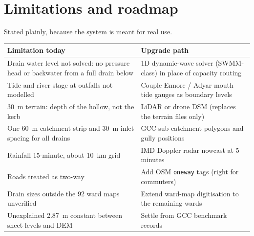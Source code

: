 \documentclass[11pt,a4paper]{article}
\begin{document}
\section{Limitations and roadmap}

Stated plainly, because the system is meant for real use.
\begin{longtable}{@{}p{6.4cm}p{8.0cm}@{}}
\toprule
\textbf{Limitation today} & \textbf{Upgrade path}\\
\midrule\endhead
Drain water level not solved: no pressure head or backwater from a full drain below & 1D dynamic-wave solver (SWMM-class) in place of capacity routing\\
Tide and river stage at outfalls not modelled & Couple Ennore / Adyar mouth tide gauges as boundary levels\\
30~m terrain: depth of the hollow, not the kerb & LiDAR or drone DSM (replaces the terrain files only)\\
One 60~m catchment strip and 30~m inlet spacing for all drains & GCC sub-catchment polygons and gully positions\\
Rainfall 15-minute, about 10~km grid & IMD Doppler radar nowcast at 5 minutes\\
Roads treated as two-way & Add OSM \texttt{oneway} tags (right for commuters)\\
Drain sizes outside the 92 ward maps unverified & Extend ward-map digitisation to the remaining wards\\
Unexplained 2.87~m constant between sheet levels and DEM & Settle from GCC benchmark records\\
\bottomrule
\end{longtable}

\end{document}
